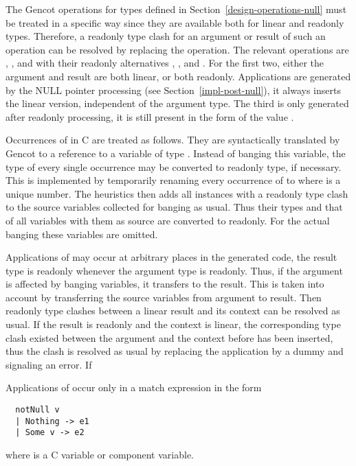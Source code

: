 The Gencot operations for  types defined in Section~\ref{design-operations-null} must be treated in a specific
way since they are available both for linear and readonly types. Therefore, a readonly type clash for an argument or result
of such an operation can be resolved by replacing the operation. The relevant operations are , ,
and  with their readonly alternatives , , and . For the first two,
either the argument and result are both linear, or both readonly. Applications are generated by the NULL pointer processing
(see Section~\ref{impl-post-null}), it always inserts the linear version, independent of the argument type. The third is only
generated after readonly processing, it is still present in the form of the value .

Occurrences of  in C are treated as follows. They are syntactically translated by Gencot to a reference to a
variable  of type . Instead of banging this variable, the type of every single
occurrence may be converted to readonly type, if necessary. This is implemented by temporarily renaming every occurrence of
 to  where  is a unique number. The heuristics then adds all instances
with a readonly type clash to the source variables collected for banging as usual. Thus their types and that of all variables
with them as source are converted to readonly. For the actual banging these variables are omitted.

Applications of  may occur at arbitrary places in the generated code, the result type is readonly whenever the
argument type is readonly. Thus, if the argument is affected by banging variables, it transfers to the result. This is taken
into account by transferring the source variables from argument to result. Then readonly type clashes between a linear result
and its context can be resolved as usual. If the result is readonly and the context is linear, the corresponding type clash
existed between the argument and the context before  has been inserted, thus the clash is resolved as usual
by replacing the  application by a dummy and signaling an error. If

Applications of  occur only in a match expression in the form
\begin{verbatim}
  notNull v
  | Nothing -> e1
  | Some v -> e2
\end{verbatim}
where  is a C variable or component variable.

